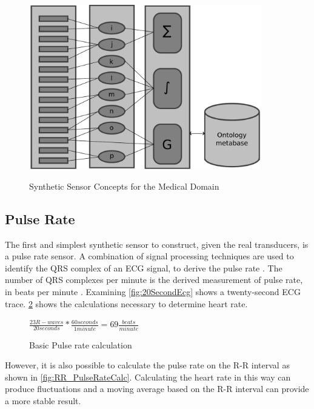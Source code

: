 \begin{figure}
	\begin{center}
		\label{fig:SyntheticSensor}
		\includegraphics[scale=1,width=0.9\textwidth]{Images/syntheticSensor.pdf} 
		\caption{Synthetic Sensor Concepts for the Medical Domain}
	\end{center}
\end{figure}

\subsection{Pulse Rate}
\label{subsec:PulseRate}
The first and simplest synthetic sensor to construct, given the real transducers, is a pulse rate sensor. A combination of signal processing techniques are used to identify the QRS complex of an ECG signal, to derive the pulse rate  \cite{Chaitanya2011}. The number of QRS complexes per minute is the derived measurement of pulse rate, in beats per minute \cite{Scully2012}. Examining \cref{fig:20SecondEcg} shows a twenty-second ECG trace. \cref{fig:PulseRateCalc} shows the calculations necessary to determine heart rate.
\begin{figure}
	\begin{center}
		\label{fig:PulseRateCalc}
		$\frac{23 R-waves}{20 seconds}*\frac{60 seconds}{1 minute}=69 \frac{beats}{minute}$
		\caption{Basic Pulse rate calculation}
	\end{center}
\end{figure}

However, it is also possible to calculate the pulse rate on the R-R interval as shown in \cref{fig:RR_PulseRateCalc}. Calculating the heart rate in this way can produce fluctuations and a moving average based on the R-R interval can provide a more stable result.

